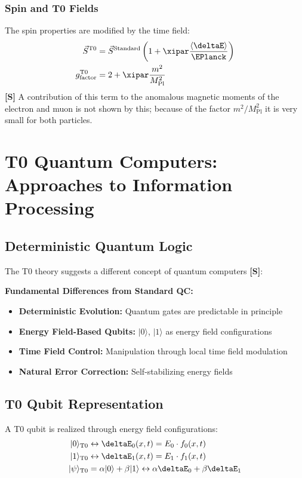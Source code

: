 	\subsubsection{Spin and T0 Fields}
	The spin properties are modified by the time field:
	\begin{align}
		\vec{S}^{\text{T0}} &= \vec{S}^{\text{Standard}} \left(1 + \xipar \frac{\langle\deltaE\rangle}{\EPlanck}\right) \\
		g_{\text{factor}}^{\text{T0}} &= 2 + \xipar \frac{m^2}{M_{\text{Pl}}^2}
	\end{align}
	\textbf{[S]} A contribution of this term to the anomalous magnetic moments of the electron and muon is not shown by this; because of the factor $m^2/M_{\text{Pl}}^2$ it is very small for both particles.
	\section{T0 Quantum Computers: Approaches to Information Processing}
	\subsection{Deterministic Quantum Logic}
	The T0 theory suggests a different concept of quantum computers \textbf{[S]}:
	\begin{tcolorbox}[colback=yellow!5!white,colframe=yellow!75!black,title={T0 Quantum Computer Principles}]
		\textbf{Fundamental Differences from Standard QC:}
		\begin{itemize}
			\item \textbf{Deterministic Evolution:} Quantum gates are predictable in principle
			\item \textbf{Energy Field-Based Qubits:} $|0\rangle$, $|1\rangle$ as energy field configurations
			\item \textbf{Time Field Control:} Manipulation through local time field modulation
			\item \textbf{Natural Error Correction:} Self-stabilizing energy fields
		\end{itemize}
	\end{tcolorbox}
	\subsection{T0 Qubit Representation}
	A T0 qubit is realized through energy field configurations:
	\begin{align}
		|0\rangle_{\text{T0}} &\leftrightarrow \deltaE_0(x,t) = E_0 \cdot f_0(x,t) \\
		|1\rangle_{\text{T0}} &\leftrightarrow \deltaE_1(x,t) = E_1 \cdot f_1(x,t) \\
		|\psi\rangle_{\text{T0}} &= \alpha|0\rangle + \beta|1\rangle \leftrightarrow \alpha\deltaE_0 + \beta\deltaE_1
	\end{align}
